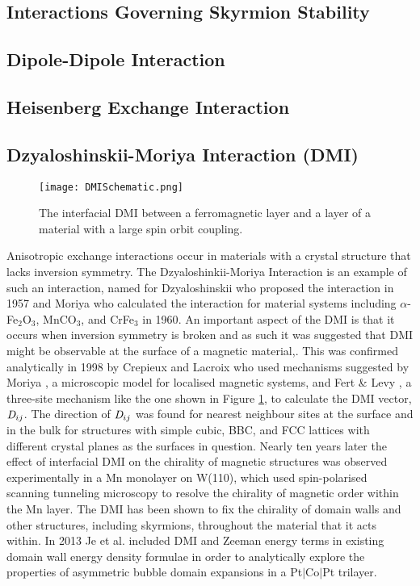     \subsection{Interactions Governing Skyrmion Stability}\label{subsec:InteractionsGovSkyrmions}

    \subsection*{Dipole-Dipole Interaction}\label{subsec:DipoleInt}

    \subsection*{Heisenberg Exchange Interaction}\label{subsec:ExchangeInt}

    \subsection*{Dzyaloshinskii-Moriya Interaction (DMI)}\label{subsec:DMI}
    \begin{figure}[htbp]
	    \centering	\texttt{[image: DMISchematic.png]}
	    \caption{The interfacial DMI between a ferromagnetic layer and a layer of a material with a large spin orbit coupling.}
	    \label{fig:DMISchematic}
    \end{figure}
    Anisotropic exchange interactions occur in materials with a crystal structure that lacks inversion symmetry. The Dzyaloshinkii-Moriya Interaction is an example of such an interaction, named for Dzyaloshinskii who proposed the interaction in 1957\cite{Dzyaloshinskii1958} and Moriya who calculated the interaction for material systems including $\alpha$-Fe$_{2}$O$_{3}$, MnCO$_{3}$, and CrFe$_{3}$ in 1960\cite{Moriya1960}. An important aspect of the DMI is that it occurs when inversion symmetry is broken and as such it was suggested that DMI might be observable at the surface of a magnetic material,\cite{Fert1991}. This was confirmed analytically in 1998 by Crepieux and Lacroix \cite{Crepieux1998} who used mechanisms suggested by Moriya \cite{Moriya1960}, a microscopic model for localised magnetic systems, and Fert \& Levy \cite{Levy1981}, a three-site mechanism like the one shown in Figure \ref{fig:DMISchematic}, to calculate the DMI vector, $\emph{D}_{ij}$. The direction of $\emph{D}_{ij}$ was found for nearest neighbour sites at the surface and in the bulk for structures with simple cubic, BBC, and FCC lattices with different crystal planes as the surfaces in question.\cite{Crepieux1998} Nearly ten years later the effect of interfacial DMI on the chirality of magnetic structures was observed experimentally in a Mn monolayer on W(110), which used spin-polarised scanning tunneling microscopy to resolve the chirality of magnetic order within the Mn layer.\cite{Bode2007} The DMI has been shown to fix the chirality of domain walls and other structures, including skyrmions, throughout the material that it acts within. \cite{Heide2008,Benitez2015} In 2013 Je et al. included DMI and Zeeman energy terms in existing domain wall energy density formulae\cite{Lemerle1998,Kim2009} in order to analytically explore the properties of asymmetric bubble domain expansions in a Pt$\lvert$Co$\lvert$Pt trilayer.

